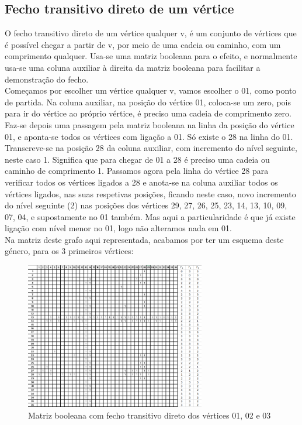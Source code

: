 \subsection{  Fecho transitivo direto de um vértice }
O fecho transitivo direto de um vértice qualquer v, é um conjunto de vértices que é possível chegar a
partir de v, por meio de uma cadeia ou caminho, com um comprimento qualquer. Usa-se uma matriz booleana 
para o efeito, e normalmente usa-se uma coluna auxiliar à direita da matriz booleana para facilitar a 
demonstração do fecho.\\
\indent Começamos por escolher um vértice qualquer v, vamos escolher o 01, como ponto de partida. Na coluna
auxiliar, na posição do vértice 01, coloca-se um zero, pois para ir do vértice ao próprio vértice, é preciso uma 
cadeia de comprimento zero. Faz-se depois uma passagem pela matriz booleana na linha da posição do vértice
01, e aponta-se todos os vértices com ligação a 01. Só existe o 28 na linha do 01. Transcreve-se na posição 28
da coluna auxiliar, com incremento do nível seguinte, neste caso 1. Significa que para chegar de 01 a 28 é 
preciso uma cadeia ou caminho de comprimento 1. Passamos agora pela linha do vértice 28 para verificar
todos os vértices ligados a 28 e anota-se na coluna auxiliar todos os vértices ligados, nas suas respetivas 
posições, ficando neste caso, novo incremento do nível seguinte (2) nas posições dos vértices 29, 27, 26, 25, 
23, 14, 13, 10, 09, 07, 04, e supostamente no 01 também. Mas aqui a particularidade é que já existe ligação 
com nível menor no 01, logo não alteramos nada em 01.\\
\indent Na matriz deste grafo aqui representada, acabamos por ter um esquema deste género, para os 3 
primeiros vértices:
\begin{figure}[h]
    \centering
    \includegraphics[width=0.7\textwidth]{imgs/Figura14}
    \caption{Matriz booleana com fecho transitivo direto dos vértices 01, 02 e 03\label{fig:imagem15}}
\end{figure}\\
